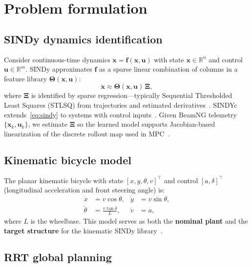 \documentclass[letterpaper, 10 pt, conference]{ieeeconf}  %
\begin{document}
\section{Problem formulation}

\subsection{SINDy dynamics identification}

Consider continuous-time dynamics $\dot{\mathbf{x}} = \mathbf{f}(\mathbf{x}, \mathbf{u})$ with state $\mathbf{x} \in \mathbb{R}^n$ and control $\mathbf{u} \in \mathbb{R}^m$.
SINDy approximates $\mathbf{f}$ as a sparse linear combination of columns in a feature library $\boldsymbol{\Theta}(\mathbf{x}, \mathbf{u})$:
\begin{equation}
  \dot{\mathbf{x}} \approx \boldsymbol{\Theta}(\mathbf{x}, \mathbf{u}) \,\boldsymbol{\Xi},
  \label{eq:sindy}
\end{equation}
where $\boldsymbol{\Xi}$ is identified by sparse regression---typically Sequential Thresholded Least Squares (STLSQ) from trajectories and estimated derivatives~\cite{Brunton2016SINDy}.
SINDYc extends~\eqref{eq:sindy} to systems with control inputs~\cite{Brunton2016SINDYc}.
Given BeamNG telemetry $\{\mathbf{x}_k, \mathbf{u}_k\}$, we estimate $\boldsymbol{\Xi}$ so the learned model supports Jacobian-based linearization of the discrete rollout map used in MPC~\cite{Corbetta2020}.

\subsection{Kinematic bicycle model}

The planar kinematic bicycle with state $[x, y, \theta, v]^\top$ and control $[a, \delta]^\top$ (longitudinal acceleration and front steering angle) is:
\begin{align}
  \dot{x} &= v\cos\theta, &
  \dot{y} &= v\sin\theta, \nonumber\\
  \dot{\theta} &= \frac{v\tan\delta}{L}, &
  \dot{v} &= a,
  \label{eq:bicycle}
\end{align}
where $L$ is the wheelbase.
This model serves as both the \textbf{nominal plant} and the \textbf{target structure} for the kinematic SINDy library~\cite{Han2024Dynamics,Nurbayeva2023}.

\subsection{RRT global planning}
\end{document}
